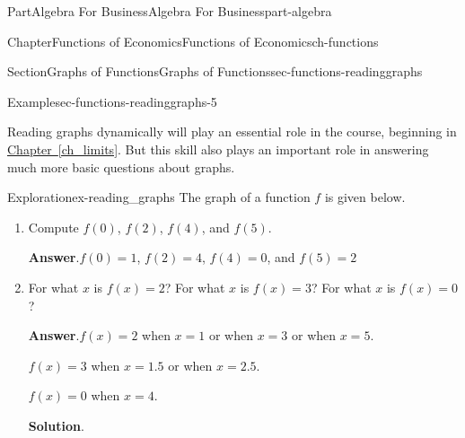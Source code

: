 \documentclass[oneside,10pt,]{tufte-book}
\newcommand{\blocktitlefont}{\relax}
\newcommand{\xreffont}{\relax}
\numberwithin{equation}{chapter}
\begin{document}
\begin{partptx}{Part}{Algebra For Business}{}{Algebra For Business}{}{}{part-algebra}
\begin{chapterptx}{Chapter}{Functions of Economics}{}{Functions of Economics}{}{}{ch-functions}
\begin{sectionptx}{Section}{Graphs of Functions}{}{Graphs of Functions}{}{}{sec-functions-readinggraphs}
\begin{example}{Example}{}{sec-functions-readinggraphs-5}
\begin{image}{0}{1}{0}{}
{\begin{tikzpicture}
\end{tikzpicture}
}%
\end{image}%
\end{example}
Reading graphs dynamically will play an essential role in the course, beginning in \hyperref[ch_limits]{Chapter~{\xreffont\ref{ch_limits}}}. But this skill also plays an important role in answering much more basic questions about graphs.%
\begin{exploration}{Exploration}{}{ex-reading_graphs}%
The graph of a function \(f\) is given below.%
\begin{image}{0.25}{0.5}{0.25}{}%
%
\end{image}%
\begin{enumerate}[font=\bfseries,label=(\alph*),ref=\alph*]%
\item{}Compute \(f(0)\), \(f(2)\), \(f(4)\), and \(f(5)\).%
\par\smallskip%
\noindent\textbf{\blocktitlefont Answer}.\hypertarget{ex-reading_graphs-2-2}{}\quad{}\(f(0)=1\), \(f(2)=4\), \(f(4)=0\), and \(f(5)=2\)%
\item{}For what \(x\) is \(f(x)=2\)?  For what  \(x\) is \(f(x)=3\)? For what  \(x\) is \(f(x)=0\)?%
\par\smallskip%
\noindent\textbf{\blocktitlefont Answer}.\hypertarget{ex-reading_graphs-3-2}{}\quad{}\(f(x)=2\) when \(x=1\) or when \(x=3\) or when \(x=5\).%
\par
\(f(x)=3\) when \(x=1.5\) or when \(x=2.5\).%
\par
\(f(x)=0\) when \(x=4\).%
\par\smallskip%
\noindent\textbf{\blocktitlefont Solution}.\hypertarget{ex-reading_graphs-3-3}{}\quad{}\begin{image}{0.25}{0.5}{0.25}{}%

\end{image}
\end{enumerate}
\end{exploration}
\end{sectionptx}
\end{chapterptx}
\end{partptx}
\end{document}
